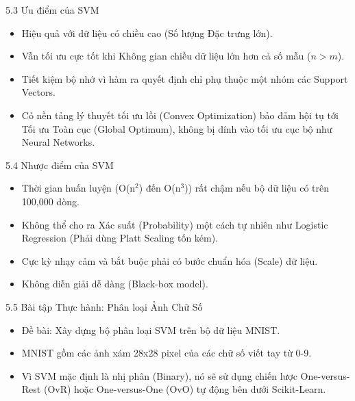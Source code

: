 \documentclass[aspectratio=169, 12pt]{beamer}
\begin{document}
\begin{frame}{5.3 Ưu điểm của SVM}
    \begin{itemize}
        \item Hiệu quả với dữ liệu có chiều cao (Số lượng Đặc trưng lớn).
        \item Vẫn tối ưu cực tốt khi Không gian chiều dữ liệu lớn hơn cả số mẫu ($n > m$).
        \item Tiết kiệm bộ nhớ vì hàm ra quyết định chỉ phụ thuộc một nhóm các Support Vectors.
        \item Có nền tảng lý thuyết tối ưu lồi (Convex Optimization) bảo đảm hội tụ tới Tối ưu Toàn cục (Global Optimum), không bị dính vào tối ưu cục bộ như Neural Networks.
    \end{itemize}
\end{frame}

\begin{frame}{5.4 Nhược điểm của SVM}
    \begin{itemize}
        \item Thời gian huấn luyện (O(n$^2$) đến O(n$^3$)) rất chậm nếu bộ dữ liệu có trên 100,000 dòng.
        \item Không thể cho ra Xác suất (Probability) một cách tự nhiên như Logistic Regression (Phải dùng Platt Scaling tốn kém).
        \item Cực kỳ nhạy cảm và bắt buộc phải có bước chuẩn hóa (Scale) dữ liệu.
        \item Không diễn giải dễ dàng (Black-box model).
    \end{itemize}
\end{frame}

\begin{frame}{5.5 Bài tập Thực hành: Phân loại Ảnh Chữ Số}
    \begin{itemize}
        \item Đề bài: Xây dựng bộ phân loại SVM trên bộ dữ liệu MNIST.
        \item MNIST gồm các ảnh xám 28x28 pixel của các chữ số viết tay từ 0-9.
        \item Vì SVM mặc định là nhị phân (Binary), nó sẽ sử dụng chiến lược One-versus-Rest (OvR) hoặc One-versus-One (OvO) tự động bên dưới Scikit-Learn.
    \end{itemize}
\end{frame}
\end{document}
